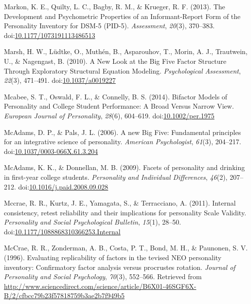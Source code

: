 \documentclass[,man]{apa6}
\theoremstyle{definition}
\theoremstyle{definition}
\theoremstyle{definition}
\theoremstyle{remark}
\begin{document}
\leavevmode\hypertarget{ref-Markon2013}{}%
Markon, K. E., Quilty, L. C., Bagby, R. M., \& Krueger, R. F. (2013).
The Development and Psychometric Properties of an Informant-Report Form
of the Personality Inventory for DSM-5 (PID-5). \emph{Assessment},
\emph{20}(3), 370--383.
doi:\href{https://doi.org/10.1177/1073191113486513}{10.1177/1073191113486513}

\leavevmode\hypertarget{ref-Marsh2010}{}%
Marsh, H. W., Lüdtke, O., Muthén, B., Asparouhov, T., Morin, A. J.,
Trautwein, U., \& Nagengast, B. (2010). A New Look at the Big Five
Factor Structure Through Exploratory Structural Equation Modeling.
\emph{Psychological Assessment}, \emph{22}(3), 471--491.
doi:\href{https://doi.org/10.1037/a0019227}{10.1037/a0019227}

\leavevmode\hypertarget{ref-Mcabee2014}{}%
Mcabee, S. T., Oswald, F. L., \& Connelly, B. S. (2014). Bifactor Models
of Personality and College Student Performance: A Broad Versus Narrow
View. \emph{European Journal of Personality}, \emph{28}(6), 604--619.
doi:\href{https://doi.org/10.1002/per.1975}{10.1002/per.1975}

\leavevmode\hypertarget{ref-McAdams2006a}{}%
McAdams, D. P., \& Pals, J. L. (2006). A new Big Five: Fundamental
principles for an integrative science of personality. \emph{American
Psychologist}, \emph{61}(3), 204--217.
doi:\href{https://doi.org/10.1037/0003-066X.61.3.204}{10.1037/0003-066X.61.3.204}

\leavevmode\hypertarget{ref-McAdams2009}{}%
McAdams, K. K., \& Donnellan, M. B. (2009). Facets of personality and
drinking in first-year college students. \emph{Personality and
Individual Differences}, \emph{46}(2), 207--212.
doi:\href{https://doi.org/10.1016/j.paid.2008.09.028}{10.1016/j.paid.2008.09.028}

\leavevmode\hypertarget{ref-Mccrae2011}{}%
Mccrae, R. R., Kurtz, J. E., Yamagata, S., \& Terracciano, A. (2011).
Internal consistency, retest reliability and their implications for
personality Scale Validity. \emph{Personality and Social Psychological
Bulletin}, \emph{15}(1), 28--50.
doi:\href{https://doi.org/10.1177/1088868310366253.Internal}{10.1177/1088868310366253.Internal}

\leavevmode\hypertarget{ref-McCrae1996}{}%
McCrae, R. R., Zonderman, A. B., Costa, P. T., Bond, M. H., \& Paunonen,
S. V. (1996). Evaluating replicability of factors in the tevised NEO
personality inventory: Confirmatory factor analysis versus procrustes
rotation. \emph{Journal of Personality and Social Psychology},
\emph{70}(3), 552--566. Retrieved from
\url{http://www.sciencedirect.com/science/article/B6X01-46SGF6X-B/2/cfbcc79b23f57818759b3ae2b7f949b5}
\end{document}

